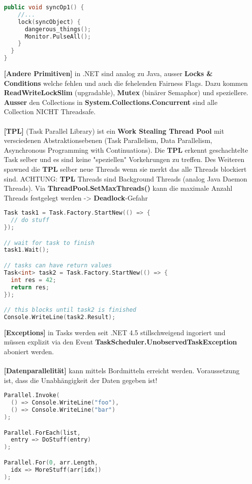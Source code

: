 \documentclass[8pt]{extarticle}
\let\oldtextbf\textbf
\renewcommand{\textbf}{\tiny\oldtextbf}
\begin{document}
\begin{multicols*}{5}
\begin{lstlisting}[language=c++]
  public void syncOp1() {
    //...
    lock(syncObject) {
      dangerous_things();
      Monitor.PulseAll();
    }
  }
}
\end{lstlisting}
\textbf{[Andere Primitiven]} in .NET sind analog zu Java, ausser \textbf{Locks \& Conditions} welche fehlen und auch die fehelenden Fairness Flags. Dazu kommen \textbf{ReadWriteLockSlim} (upgradable), \textbf{Mutex} (binärer Semaphor) und speziellere. \textbf{Ausser} den Collections in \textbf{System.Collections.Concurrent} sind alle Collection NICHT Threadsafe.\\\\
\textbf{[TPL]} (Task Parallel Library) ist ein \textbf{Work Stealing Thread Pool} mit versciedenen Abstraktionsebenen (Task Parallelism, Data Parallelism, Asynchronous Programming with Continuations). Die \textbf{TPL} erkennt geschachtelte Task selber und es sind keine "speziellen" Vorkehrungen zu treffen. Des Weiteren spawned die \textbf{TPL} selber neue Threads wenn sie merkt das alle Threads blockiert sind. ACHTUNG: \textbf{TPL} Threads sind Background Threads (analog Java Daemon Threads). Via \textbf{ThreadPool.SetMaxThreads()} kann die maximale Anzahl Threads festgelegt werden -> \textbf{Deadlock}-Gefahr
\begin{lstlisting}[language=c++]
Task task1 = Task.Factory.StartNew(() => {
  // do stuff
});

// wait for task to finish
task1.Wait();

// tasks can have return values
Task<int> task2 = Task.Factory.StartNew(() => {
  int res = 42;
  return res;
});

// this blocks until task2 is finished
Console.WriteLine(task2.Result);
\end{lstlisting}
\textbf{[Exceptions]} in Tasks werden seit .NET 4.5 stillschweigend ingoriert und müssen explizit via den Event \textbf{TaskScheduler.UnobservedTaskException} aboniert werden.\\\\
\textbf{[Datenparallelität]} kann mittels Bordmitteln erreicht werden. Voraussetzung ist, dass die Unabhängigkeit der Daten gegeben ist!
\begin{lstlisting}[language=c++]
Parallel.Invoke(
  () => Console.WriteLine("foo"),
  () => Console.WriteLine("bar")
);

Parallel.ForEach(list,
  entry => DoStuff(entry)
);

Parallel.For(0, arr.Length,
  idx => MoreStuff(arr[idx])
);
\end{lstlisting}
\end{multicols*}
\end{document}
